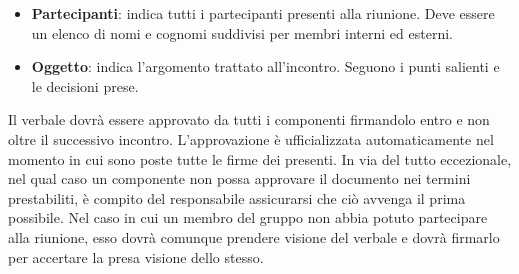\begin{itemize}
\begin{itemize}
\item \textbf{Partecipanti}: indica tutti i partecipanti presenti alla riunione. Deve essere un elenco di nomi e cognomi suddivisi per membri interni ed esterni.
\item \textbf{Oggetto}: indica l'argomento trattato all'incontro. Seguono i punti salienti e le decisioni prese.
\end{itemize}
Il verbale dovrà essere approvato da tutti i componenti firmandolo entro e non oltre il successivo incontro. L'approvazione è ufficializzata automaticamente nel momento in cui sono poste tutte le firme dei presenti. In via del tutto eccezionale, nel qual caso un componente non possa approvare il documento nei termini prestabiliti, è compito del responsabile assicurarsi che ciò avvenga il prima possibile. Nel caso in cui un membro del gruppo non abbia potuto partecipare alla riunione, esso dovrà comunque prendere visione del verbale e dovrà firmarlo per accertare la presa visione dello stesso.
\end{itemize}

